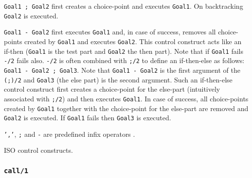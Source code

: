 \texttt{Goal1 ; Goal2} first creates a choice-point and executes
\texttt{Goal1}. On backtracking \texttt{Goal2} is executed.

\texttt{Goal1 -{\gt} Goal2} first executes \texttt{Goal1} and,
in case of success, removes all choice-points created by \texttt{Goal1} and
executes \texttt{Goal2}. This control construct acts like an if-then
(\texttt{Goal1} is the test part and \texttt{Goal2} the then part). Note that
if \texttt{Goal1} fails \texttt{-{\gt}/2} fails also. \texttt{-{\gt}/2} is
often combined with \texttt{;/2} to define an if-then-else as follows:
\texttt{Goal1 -{\gt} Goal2 ; Goal3}. Note that \texttt{Goal1 -{\gt} Goal2}
is the first argument of the \texttt{(;)/2} and \texttt{Goal3} (the else
part) is the second argument. Such an if-then-else control construct first
creates a choice-point for the else-part (intuitively associated with
\texttt{;/2}) and then executes \texttt{Goal1}. In case of success, all
choice-points created by \texttt{Goal1} together with the choice-point for
the else-part are removed and \texttt{Goal2} is executed. If \texttt{Goal1}
fails then \texttt{Goal3} is executed.

\texttt{','}, \texttt{;} and \texttt{-{\gt}} are predefined infix operators
.

\begin{PlErrors}





\end{PlErrors}

\Portability

ISO control constructs.

\subsubsection{\texttt{call/1}}
\label{call/1}

